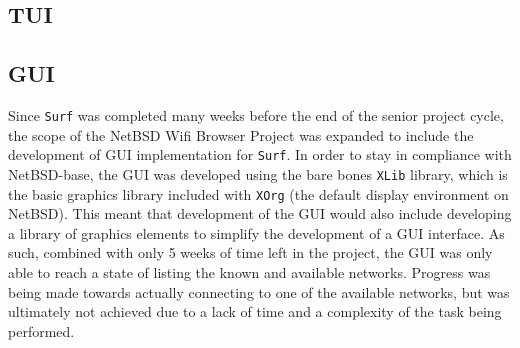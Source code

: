 \documentclass[11pt]{article}
\begin{document}
\subsection*{TUI}

\subsection*{GUI}
Since \texttt{Surf} was completed many weeks before the end of the senior project cycle,
the scope of the NetBSD Wifi Browser Project was expanded to include the development of 
GUI implementation for \texttt{Surf}.
In order to stay in compliance with NetBSD-base, the GUI was developed using the bare bones
\texttt{XLib} library, which is the basic graphics library included with \texttt{XOrg} 
(the default display environment on NetBSD).
This meant that development of the GUI would also include developing a library of graphics
elements to simplify the development of a GUI interface.
As such, combined with only 5 weeks of time left in the project, the GUI was only able
to reach a state of listing the known and available networks.
Progress was being made towards actually connecting to one of the available networks,
but was ultimately not achieved due to a lack of time and a complexity of the task
being performed.
\end{document}
